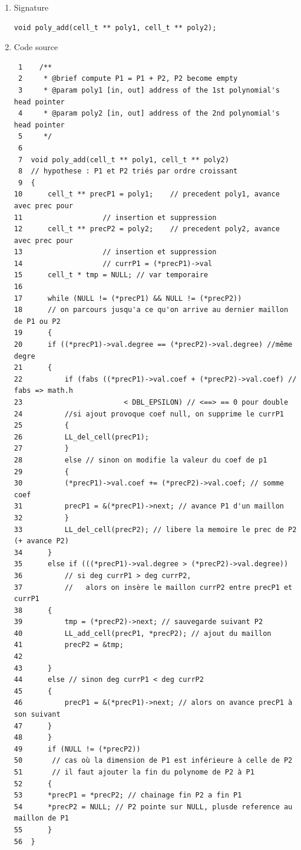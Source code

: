 \documentclass[11pt]{article}
\begin{document}
\begin{enumerate}
\item Signature
\label{sec:org09f3a91}

\begin{verbatim}
void poly_add(cell_t ** poly1, cell_t ** poly2);
\end{verbatim}

\item Code source
\label{sec:orgf9601b5}

\begin{verbatim}
 1    /**
 2     * @brief compute P1 = P1 + P2, P2 become empty
 3     * @param poly1 [in, out] address of the 1st polynomial's head pointer
 4     * @param poly2 [in, out] address of the 2nd polynomial's head pointer
 5     */
 6  
 7  void poly_add(cell_t ** poly1, cell_t ** poly2)
 8  // hypothese : P1 et P2 triés par ordre croissant
 9  {
10      cell_t ** precP1 = poly1;    // precedent poly1, avance avec prec pour
11  				 // insertion et suppression
12      cell_t ** precP2 = poly2;    // precedent poly2, avance avec prec pour
13  				 // insertion et suppression
14  				 // currP1 = (*precP1)->val
15      cell_t * tmp = NULL; // var temporaire
16  
17      while (NULL != (*precP1) && NULL != (*precP2))
18      // on parcours jusqu'a ce qu'on arrive au dernier maillon de P1 ou P2
19      {
20  	if ((*precP1)->val.degree == (*precP2)->val.degree) //même degre
21  	{
22  	    if (fabs ((*precP1)->val.coef + (*precP2)->val.coef) // fabs => math.h
23  				      < DBL_EPSILON) // <==> == 0 pour double 
24  		//si ajout provoque coef null, on supprime le currP1
25  	    {
26  		LL_del_cell(precP1);
27  	    }
28  	    else // sinon on modifie la valeur du coef de p1
29  	    {
30  		(*precP1)->val.coef += (*precP2)->val.coef; // somme coef
31  		precP1 = &(*precP1)->next; // avance P1 d'un maillon
32  	    }
33  	    LL_del_cell(precP2); // libere la memoire le prec de P2 (+ avance P2)
34  	}
35  	else if (((*precP1)->val.degree > (*precP2)->val.degree))
36  	    // si deg currP1 > deg currP2,
37  	    //   alors on insère le maillon currP2 entre precP1 et currP1
38  	{
39  	    tmp = (*precP2)->next; // sauvegarde suivant P2
40  	    LL_add_cell(precP1, *precP2); // ajout du maillon
41  	    precP2 = &tmp; 
42  
43  	}
44  	else // sinon deg currP1 < deg currP2
45  	{
46  	    precP1 = &(*precP1)->next; // alors on avance precP1 à son suivant
47  	}
48      }
49      if (NULL != (*precP2))
50       // cas où la dimension de P1 est inférieure à celle de P2
51       // il faut ajouter la fin du polynome de P2 à P1
52      {
53  	*precP1 = *precP2; // chainage fin P2 a fin P1
54  	*precP2 = NULL; // P2 pointe sur NULL, plusde reference au maillon de P1 
55      }
56  }
\end{verbatim}


\end{enumerate}
\end{document}

